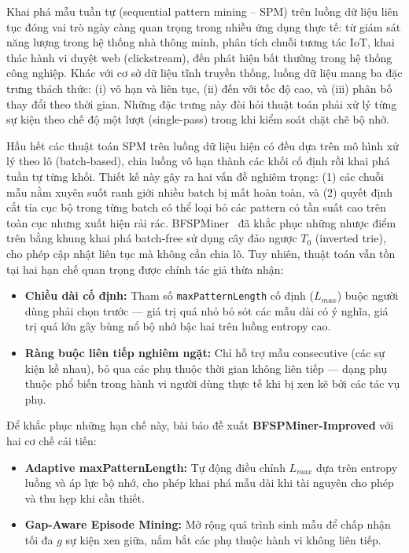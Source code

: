 \documentclass[conference]{IEEEtran}
\begin{document}
Khai phá mẫu tuần tự (sequential pattern mining -- SPM) trên luồng dữ liệu liên tục đóng vai trò ngày càng quan trọng trong nhiều ứng dụng thực tế: từ giám sát năng lượng trong hệ thống nhà thông minh, phân tích chuỗi tương tác IoT, khai thác hành vi duyệt web (clickstream), đến phát hiện bất thường trong hệ thống công nghiệp. Khác với cơ sở dữ liệu tĩnh truyền thống, luồng dữ liệu mang ba đặc trưng thách thức: (i) vô hạn và liên tục, (ii) đến với tốc độ cao, và (iii) phân bố thay đổi theo thời gian. Những đặc trưng này đòi hỏi thuật toán phải xử lý từng sự kiện theo chế độ một lượt (single-pass) trong khi kiểm soát chặt chẽ bộ nhớ.

Hầu hết các thuật toán SPM trên luồng dữ liệu hiện có đều dựa trên mô hình xử lý theo lô (batch-based), chia luồng vô hạn thành các khối cố định rồi khai phá tuần tự từng khối. Thiết kế này gây ra hai vấn đề nghiêm trọng: (1) các chuỗi mẫu nằm xuyên suốt ranh giới nhiều batch bị mất hoàn toàn, và (2) quyết định cắt tỉa cục bộ trong từng batch có thể loại bỏ các pattern có tần suất cao trên toàn cục nhưng xuất hiện rải rác. BFSPMiner~\cite{hassani2019} đã khắc phục những nhược điểm trên bằng khung khai phá batch-free sử dụng cây đảo ngược $T_0$ (inverted trie), cho phép cập nhật liên tục mà không cần chia lô. Tuy nhiên, thuật toán vẫn tồn tại hai hạn chế quan trọng được chính tác giả thừa nhận:

\begin{itemize}
    \item \textbf{Chiều dài cố định:} Tham số \texttt{maxPatternLength} cố định ($L_{max}$) buộc người dùng phải chọn trước --- giá trị quá nhỏ bỏ sót các mẫu dài có ý nghĩa, giá trị quá lớn gây bùng nổ bộ nhớ bậc hai trên luồng entropy cao.
    \item \textbf{Ràng buộc liên tiếp nghiêm ngặt:} Chỉ hỗ trợ mẫu consecutive (các sự kiện kề nhau), bỏ qua các phụ thuộc thời gian không liên tiếp --- dạng phụ thuộc phổ biến trong hành vi người dùng thực tế khi bị xen kẽ bởi các tác vụ phụ.
\end{itemize}

Để khắc phục những hạn chế này, bài báo đề xuất \textbf{BFSPMiner-Improved} với hai cơ chế cải tiến:
\begin{itemize}
    \item \textbf{Adaptive maxPatternLength:} Tự động điều chỉnh $L_{max}$ dựa trên entropy luồng và áp lực bộ nhớ, cho phép khai phá mẫu dài khi tài nguyên cho phép và thu hẹp khi cần thiết.
    \item \textbf{Gap-Aware Episode Mining:} Mở rộng quá trình sinh mẫu để chấp nhận tối đa $g$ sự kiện xen giữa, nắm bắt các phụ thuộc hành vi không liên tiếp.
\end{itemize}
\end{document}
